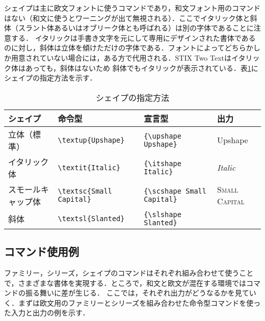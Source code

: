 シェイプは主に欧文フォントに使うコマンドであり，和文フォント用のコマンドはない（和文に使うとワーニングが出て無視される）．ここでイタリック体と斜体（スラント体あるいはオブリーク体とも呼ばれる）は別の字体であることに注意する．
イタリックは手書き文字を元にして専用にデザインされた書体であるのに対し，斜体は立体を傾けただけの字体である．フォントによってどちらかしか用意されていない場合には，ある方で代用される．STIX Two Textはイタリック体はあっても，斜体はないため
斜体でもイタリックが表示されている．表\ref{shape}にシェイプの指定方法を示す．
\begin{table}[t]
\caption{シェイプの指定方法}\label{shape}
\centering
\begin{tabular}{l||l|l|l}\hline
シェイプ& 命令型 & 宣言型 & 出力\\ \hline
立体（標準）&{\small\verb|\textup{Upshape}|} & {\small\verb|{\upshape Upshape}|} & \textup{\textrm{Upshape}}\\
イタリック体&{\small\verb|\textit{Italic}|} & {\small\verb|{\itshape Italic}|} & \textit{\textrm{Italic}}\\
スモールキャップ体&{\small\verb|\textsc{Small Capital}|} & {\small\verb|{\scshape Small Capital}|} &\textsc{\textrm{Small Capital}}\\
斜体 & {\small\verb|\textsl{Slanted}|} & {\small\verb|{\slshape Slanted}|} & \color{red}{\textsl{\textrm{Slanted}}}\\ \hline
\end{tabular}
\end{table}


\subsection{コマンド使用例}

ファミリー，シリーズ，シェイプのコマンドはそれぞれ組み合わせて使うことで，さまざまな書体を実現する．ところで，和文と欧文が混在する環境ではコマンドの振る舞いに差が生じる．
ここでは，それぞれ出力がどうなるかを見ていく．まずは欧文用のファミリーとシリーズを組み合わせた命令型コマンドを使った入力と出力の例を示す．

